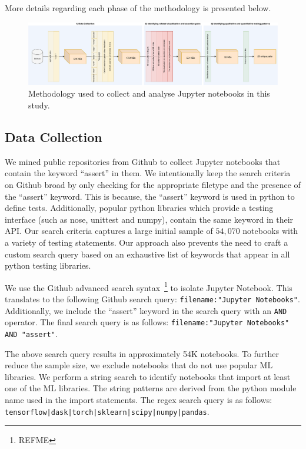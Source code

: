 \documentclass[acmsmall,screen,review,anonymous]{acmart}
\begin{document}
More details regarding each phase of the methodology is presented below.

\begin{figure}
  \centering
  \includegraphics[width=\textwidth]{method.pdf}
  \caption{Methodology used to collect and analyse Jupyter notebooks
    in this study.}
  \label{fig:method}
\end{figure}

\subsection{Data Collection}\label{sec:data-collect}

We mined public repositories from Github to collect Jupyter notebooks that contain the keyword ``assert'' in them. We intentionally keep the search criteria on Github broad by only checking for the appropriate filetype and the presence of the ``assert'' keyword. This is because, the ``assert'' keyword is used in python to define tests. Additionally, popular python libraries which provide a testing interface (such as nose, unittest and numpy), contain the same keyword in their API. Our search criteria captures a large initial sample of $54,070$ notebooks with a variety of testing statements. Our approach also prevents the need to craft a custom search query based on an exhaustive list of keywords that appear in all python testing libraries.

We use the Github advanced search syntax~\footnote{REFME} to isolate Jupyter Notebook. This translates to the following Github search query: \texttt{filename:"Jupyter Notebooks"}. Additionally, we include the ``assert'' keyword in the search query with an \texttt{AND} operator. The final search query is as follows: \texttt{filename:"Jupyter Notebooks" AND "assert"}.

The above search query results in approximately 54K notebooks. To further reduce the sample size, we exclude notebooks that do not use popular ML libraries. We perform a string search to identify notebooks that import at least one of the ML libraries. The string patterns are derived from the python module name used in the import statements. The regex search query is as follows: \texttt{tensorflow|dask|torch|sklearn|scipy|numpy|pandas}.
\end{document}
